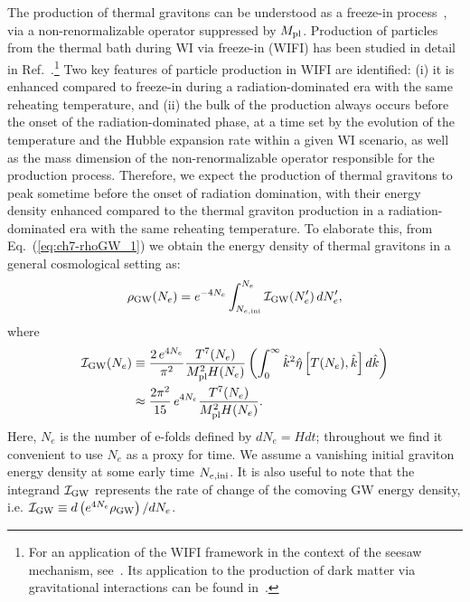 The production of thermal gravitons can be understood as a freeze-in process~\cite{Hall:2009bx,Elahi:2014fsa}, via a non-renormalizable operator suppressed by $M_{\rm pl}$.
Production of particles from the thermal bath during WI via freeze-in (WIFI) has been studied in detail in Ref.~\cite{Freese:2024ogj}.\footnote{For an application of the WIFI framework in the context of the seesaw mechanism,   see~\cite{deSouza:2024oaz}. Its application to the production of dark matter via gravitational interactions can be found in~\cite{Wang:2025duy}.} Two key features of particle production in WIFI are identified: (i) it is enhanced compared to freeze-in during a radiation-dominated era with the same reheating temperature, and (ii) the bulk of the production always occurs before the onset of the radiation-dominated phase, at a time set by the evolution of the temperature and the Hubble expansion rate within a given WI scenario, as well as the mass dimension of the non-renormalizable operator responsible for the production process. Therefore, we expect the production of thermal gravitons to peak sometime before the onset of radiation domination, with their energy density enhanced compared to the thermal graviton production in a radiation-dominated era with the same reheating temperature. To elaborate this, from Eq.~(\ref{eq:ch7-rhoGW_1}) we obtain the energy density of thermal gravitons in a general cosmological setting as:
\begin{align}
    \rho_{\rm GW}(N_e)=e^{-4 N_e}\int_{N_{e,{\rm ini}}}^{N_e}\mathcal{I}_{\rm GW}(N_e^\prime)\,dN^\prime_e
    \label{eq:ch7-rhoGW_2},
\end{align}
where
\begin{align}
\nonumber\mathcal{I}_{\rm GW}(N_e)&\equiv \frac{2\,e^{4N_e}}{\pi^2 } \frac{T^7(N_e)}{M_{\rm pl}^2 H(N_e)} \left(\int_0^\infty \hat k^2 \hat{\eta}\left[T(N_e),\hat k\right]d\hat k \right)\\
&\approx \frac{2\pi^2}{15}\,e^{4N_e}\frac{T^7(N_e)}{M_{\rm pl}^2 H(N_e)}.
\label{eq:ch7-IGW}
\end{align}
Here, $N_e$ is the number of e-folds defined by $dN_e=H dt$; throughout we find it convenient to use $N_e$ as a proxy for time.
We assume a vanishing initial graviton energy density at some early time $N_{e,{\rm ini}}$. It is also useful to note that the integrand $\mathcal{I}_{\rm GW}$ represents the rate of change of the comoving GW energy density, i.e. $\mathcal{I_{\rm GW}}\equiv d\left(e^{4N_e} \rho_{\rm GW}\right)/dN_e$.

